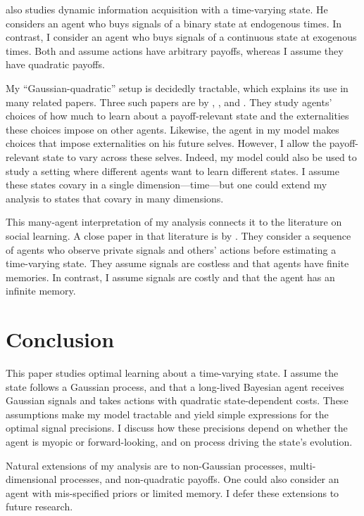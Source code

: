 \documentclass[11pt,oneside]{article}
\begin{document}
\cite{Barilla-2025-} also studies dynamic information acquisition with a time-varying state.
He considers an agent who buys signals of a binary state at endogenous times.
In contrast, I consider an agent who buys signals of a continuous state at exogenous times.
Both \cite{Barilla-2025-} and \cite{Steiner-etal-2017-ECTA} assume actions have arbitrary payoffs, whereas I assume they have quadratic payoffs.

My ``Gaussian-quadratic'' setup is decidedly tractable, which explains its use in many related papers.
Three such papers are by \cite{Colombo-etal-2014-REStud}, \cite{Hellwig-Veldkamp-2009-REStud}, and \cite{Myatt-Wallace-2012-REStud}.
They study agents' choices of how much to learn about a payoff-relevant state and the externalities these choices impose on other agents.
Likewise, the agent in my model makes choices that impose externalities on his future selves.
However, I allow the payoff-relevant state to vary across these selves.
Indeed, my model could also be used to study a setting where different agents want to learn different states.
I assume these states covary in a single dimension---time---but one could extend my analysis to states that covary in many dimensions.

This many-agent interpretation of my analysis connects it to the literature on social learning.
A close paper in that literature is by \cite{Dasaratha-etal-2023-REStud}.
They consider a sequence of agents who observe private signals and others' actions before estimating a time-varying state.
They assume signals are costless and that agents have finite memories.
In contrast, I assume signals are costly and that the agent has an infinite memory.

\section{Conclusion}
\label{sec:conclusion}

This paper studies optimal learning about a time-varying state.
I assume the state follows a Gaussian process, and that a long-lived Bayesian agent receives Gaussian signals and takes actions with quadratic state-dependent costs.
These assumptions make my model tractable and yield simple expressions for the optimal signal precisions.
I discuss how these precisions depend on whether the agent is myopic or forward-looking, and on process driving the state's evolution.

Natural extensions of my analysis are to non-Gaussian processes, multi-dimensional processes, and non-quadratic payoffs.
One could also consider an agent with mis-specified priors or limited memory.
I defer these extensions to future research.
\end{document}
